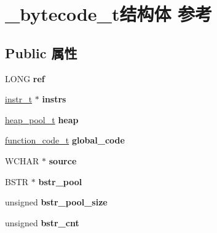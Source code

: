 \hypertarget{struct__bytecode__t}{}\section{\+\_\+bytecode\+\_\+t结构体 参考}
\label{struct__bytecode__t}
\subsection*{Public 属性}
\begin{DoxyCompactItemize}
\item 
\mbox{\label{struct__bytecode__t_a2f1a957b38dbb294d00dcd5325884a64}} 
L\+O\+NG {\bfseries ref}
\item 
\mbox{\label{struct__bytecode__t_a23973afef15ce57588f516d414ca41d1}} 
\hyperlink{structinstr__t}{instr\+\_\+t} $\ast$ {\bfseries instrs}
\item 
\mbox{\label{struct__bytecode__t_a4bde92ef564483506070dae0eeca7b54}} 
\hyperlink{structheap__pool__t}{heap\+\_\+pool\+\_\+t} {\bfseries heap}
\item 
\mbox{\label{struct__bytecode__t_af9ce3c356da431e1913b9083c864df5f}} 
\hyperlink{struct__function__code__t}{function\+\_\+code\+\_\+t} {\bfseries global\+\_\+code}
\item 
\mbox{\label{struct__bytecode__t_a2f1fc57140400e4baf485a7120d9d757}} 
W\+C\+H\+AR $\ast$ {\bfseries source}
\item 
\mbox{\label{struct__bytecode__t_a5f8a44db0765c9fed113584c2ecf34bf}} 
B\+S\+TR $\ast$ {\bfseries bstr\+\_\+pool}
\item 
\mbox{\label{struct__bytecode__t_a87a5a05bfc05e7c50f9bb9eb2ab83344}} 
unsigned {\bfseries bstr\+\_\+pool\+\_\+size}
\item 
\mbox{\label{struct__bytecode__t_ac61746943f274de0ba17264b473cade0}} 
unsigned {\bfseries bstr\+\_\+cnt}
\item 
\mbox{\label{struct__bytecode__t_ab1f2c24e93d696b279714e05235db5fa}} 

\end{DoxyCompactItemize}
